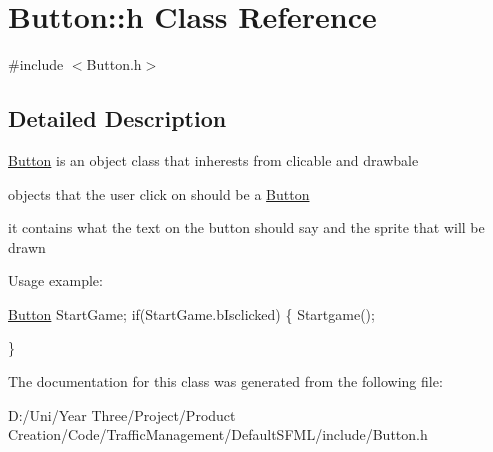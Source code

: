 \hypertarget{class_button_1_1h}{}\section{Button\+:\+:h Class Reference}
\label{class_button_1_1h}


{\ttfamily \#include $<$Button.\+h$>$}



\subsection{Detailed Description}
\hyperlink{class_button}{Button} is an object class that inherests from clicable and drawbale

objects that the user click on should be a \hyperlink{class_button}{Button}

it contains what the text on the button should say and the sprite that will be drawn

Usage example\+: 
\begin{DoxyCode}
\hyperlink{class_button}{Button} StartGame;
\textcolor{keywordflow}{if}(StartGame.bIsclicked)
\{
    Startgame();

\}
\end{DoxyCode}
 

The documentation for this class was generated from the following file\+:\begin{DoxyCompactItemize}
\item 
D\+:/\+Uni/\+Year Three/\+Project/\+Product Creation/\+Code/\+Traffic\+Management/\+Default\+S\+F\+M\+L/include/Button.\+h\end{DoxyCompactItemize}
